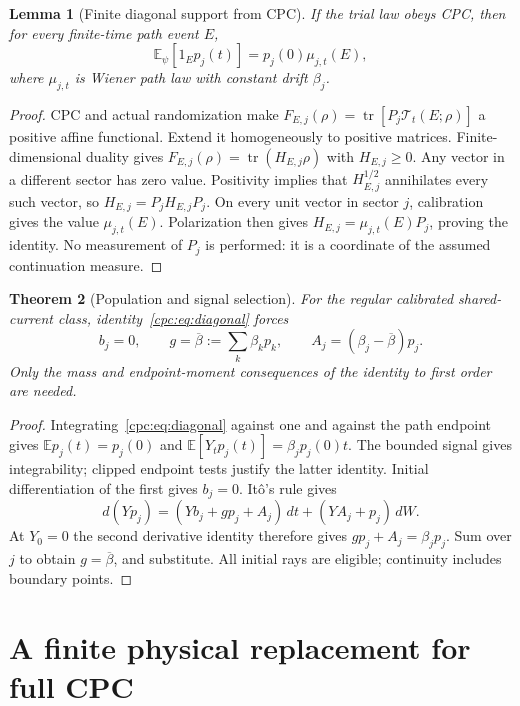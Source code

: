 \documentclass[11pt,oneside,openany]{book}
\newtheorem{theorem}{Theorem}[chapter]
\newtheorem{lemma}[theorem]{Lemma}
\theoremstyle{definition}
\theoremstyle{remark}\newtheorem{remark}[theorem]{Remark}
\begin{document}
\begin{lemma}[Finite diagonal support from CPC]
\label{cpc:lem:diagonal}
If the trial law obeys CPC, then for every finite-time path event $E$,
\begin{equation}
 \mathbb E_\psi[1_Ep_j(t)]=p_j(0)\mu_{j,t}(E),
 \label{cpc:eq:diagonal}
\end{equation}
where $\mu_{j,t}$ is Wiener path law with constant drift $\beta_j$.
\end{lemma}
\begin{proof}
CPC and actual randomization make
$F_{E,j}(\rho)=\operatorname{tr}[P_j\mathcal T_t(E;\rho)]$
a positive affine functional. Extend it homogeneously to positive matrices. Finite-dimensional duality gives $F_{E,j}(\rho)=\operatorname{tr}(H_{E,j}\rho)$ with $H_{E,j}\ge0$. Any vector in a different sector has zero value. Positivity implies that $H_{E,j}^{1/2}$ annihilates every such vector, so $H_{E,j}=P_jH_{E,j}P_j$. On every unit vector in sector $j$, calibration gives the value $\mu_{j,t}(E)$. Polarization then gives $H_{E,j}=\mu_{j,t}(E)P_j$, proving the identity. No measurement of $P_j$ is performed: it is a coordinate of the assumed continuation measure.
\end{proof}

\begin{theorem}[Population and signal selection]
\label{cpc:thm:selection}
For the regular calibrated shared-current class, identity~\eqref{cpc:eq:diagonal} forces
\begin{equation}
 b_j=0,\qquad g=\overline\beta:=\sum_k\beta_kp_k,\qquad
 A_j=(\beta_j-\overline\beta)p_j.
 \label{cpc:eq:selected}
\end{equation}
Only the mass and endpoint-moment consequences of the identity to first order are needed.
\end{theorem}
\begin{proof}
Integrating~\eqref{cpc:eq:diagonal} against one and against the path endpoint gives
$\mathbb E p_j(t)=p_j(0)$ and
$\mathbb E[Y_tp_j(t)]=\beta_jp_j(0)t$.
The bounded signal gives integrability; clipped endpoint tests justify the latter identity. Initial differentiation of the first gives $b_j=0$. It\^o's rule gives
\[
 d(Yp_j)=(Yb_j+gp_j+A_j)\,dt+(YA_j+p_j)\,dW.
\]
At $Y_0=0$ the second derivative identity therefore gives $gp_j+A_j=\beta_jp_j$. Sum over $j$ to obtain $g=\overline\beta$, and substitute. All initial rays are eligible; continuity includes boundary points.
\end{proof}

\section{A finite physical replacement for full CPC}
\end{document}
